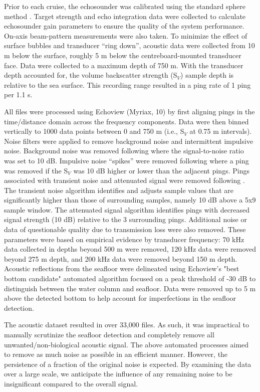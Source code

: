 \documentclass[10pt,letterpaper]{article}
\begin{document}
Prior to each cruise, the echosounder was calibrated using the standard sphere method \cite{foote1987calibration, simmonds2008fisheries}.
Target strength and echo integration data were collected to calculate echosounder gain parameters to ensure the quality of the system performance.
On-axis \cite{simmonds2008fisheries} beam-pattern measurements were also taken.
To minimize the effect of surface bubbles and transducer ``ring down”, acoustic data were collected from 10 m below the surface, roughly 5 m below the centreboard-mounted transducer face.
Data were collected to a maximum depth of 750 m.
With the transducer depth accounted for, the volume backscatter strength (S$_{V}$) sample depth is relative to the sea surface.
This recording range resulted in a ping rate of 1 ping per 1.1 s.

All files were processed using Echoview (Myriax, 10) by first aligning pings in the time/distance domain across the frequency components.
Data were then binned vertically to 1000 data points between 0 and 750 m (i.e., S$_{V}$ at 0.75 m intervals).
Noise filters were applied to remove background noise and intermittent impulsive noise.
Background noise was removed following \cite{de2007post} where the signal-to-noise ratio was set to 10 dB.
Impulsive noise ``spikes” were removed following \cite{ryan2015reducing} where a ping was removed if the S$_{V}$ was 10 dB higher or lower than the adjacent pings.
Pings associated with transient noise and attenuated signal were removed following \cite{ryan2015reducing}.
The transient noise algorithm identifies and adjusts sample values that are significantly higher than those of surrounding samples, namely 10 dB above a 5x9 sample window.
The attenuated signal algorithm identifies pings with decreased signal strength (10 dB) relative to the 3 surrounding pings.
Additional noise or data of questionable quality due to transmission loss were also removed.
These parameters were based on empirical evidence by transducer frequency: 70 kHz data collected in depths beyond 500 m were removed, 120 kHz data were removed beyond 275 m depth, and 200 kHz data were removed beyond 150 m depth.
Acoustic reflections from the seafloor were delineated using Echoview's "best bottom candidate" automated algorithm focused on a peak threshold of -30 dB to distinguish between the water column and seafloor.
Data were removed up to 5 m above the detected bottom to help account for imperfections in the seafloor detection.

The acoustic dataset resulted in over 33,000 files.
As such, it was impractical to manually scrutinize the seafloor detection and completely remove all unwanted/non-biological acoustic signal.
The above automated processes aimed to remove as much noise as possible in an efficient manner.
However, the persistence of a fraction of the original noise is expected.
By examining the data over a large scale, we anticipate the influence of any remaining noise to be insignificant compared to the overall signal.
\end{document}

